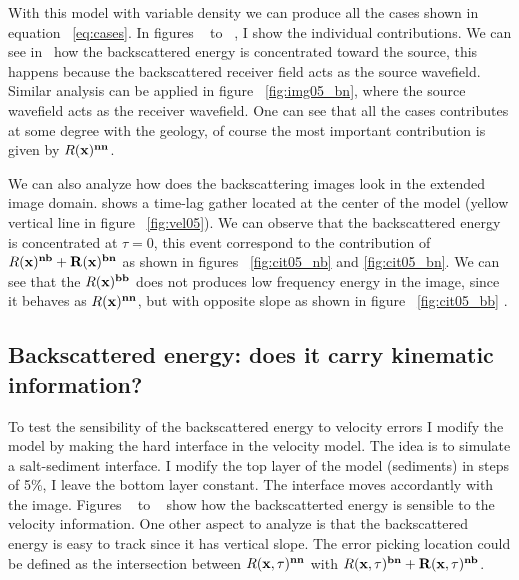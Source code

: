 With this model with variable density we can produce all the cases shown in equation ~\ref{eq:cases}.  In figures ~ to ~,
 I show the individual contributions. We can see in~ how the backscattered energy is concentrated toward the source, this happens because
the backscattered receiver field acts as the source wavefield. Similar analysis can be applied in figure ~\ref{fig:img05_bn}, where
the source wavefield acts as the receiver wavefield. One can see that all the cases contributes at some degree with the geology, of course the most important
contribution is given by $R(\bf{x})^{nn}$.

We can also analyze how does the backscattering images look in the extended image domain.  shows a time-lag
gather located at the center of the model (yellow vertical line in figure ~\ref{fig:vel05}). We can observe that the backscattered energy 
is concentrated at $\tau=0$, this event correspond to the contribution of $R(\bf{x})^{nb} + R(\bf{x})^{bn}$ as shown in figures ~\ref{fig:cit05_nb}
and \ref{fig:cit05_bn}. We can see that the $R(\bf{x})^{bb}$ does not produces low frequency energy in the image, since it behaves as $R(\bf{x})^{nn}$, but
with opposite slope as shown in figure ~\ref{fig:cit05_bb} .


\subsection{Backscattered energy: does it carry kinematic information?}

To test the sensibility of the backscattered energy to velocity errors I modify the model by making the hard interface in the velocity model. The idea
 is to simulate a salt-sediment interface. I modify the top layer of the model (sediments) in steps of 5\%, I leave the bottom layer constant. The interface
moves accordantly with the image.  Figures ~ to ~  show how the backscatterted energy is sensible to the velocity information. One other
aspect to analyze is that the backscattered energy is easy to track since it has vertical slope. The error picking location could be defined as the intersection between
$R(\bf{x},\tau)^{nn}$ with $R(\bf{x},\tau)^{bn} +R(\bf{x},\tau)^{nb}$.





